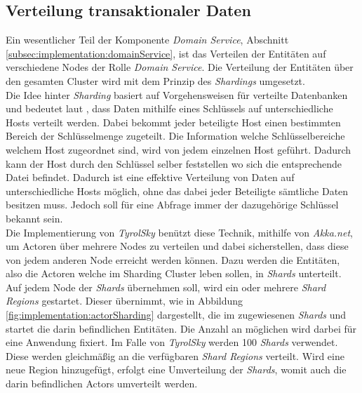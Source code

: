 \subsection{Verteilung transaktionaler Daten}
\label{subsec:implementation:akkaSharding}
Ein wesentlicher Teil der Komponente \textit{Domain Service}, Abschnitt \ref{subsec:implementation:domainService}, ist das Verteilen der Entitäten auf verschiedene Nodes der Rolle \textit{Domain Service}. Die Verteilung der Entitäten über den gesamten Cluster wird mit dem Prinzip des \textit{Shardings} umgesetzt. \\
Die Idee hinter \textit{Sharding} basiert auf Vorgehensweisen für verteilte Datenbanken und bedeutet laut \cite{shardingCattell}, dass Daten mithilfe eines Schlüssels auf unterschiedliche Hosts verteilt werden. Dabei bekommt jeder beteiligte Host einen bestimmten Bereich der Schlüsselmenge zugeteilt.
Die Information welche Schlüsselbereiche welchem Host zugeordnet sind, wird von jedem einzelnen Host geführt. Dadurch kann der Host durch den Schlüssel selber feststellen wo sich die entsprechende Datei befindet.
Dadurch ist eine effektive Verteilung von Daten auf unterschiedliche Hosts möglich, ohne das dabei jeder Beteiligte sämtliche Daten besitzen muss. Jedoch soll für eine Abfrage immer der dazugehörige Schlüssel bekannt sein. \\
Die Implementierung von \textit{TyrolSky} benützt diese Technik, mithilfe von \textit{Akka.net}, um Actoren über mehrere Nodes zu verteilen und dabei sicherstellen, dass diese von jedem anderen Node erreicht werden können. Dazu werden die Entitäten, also die Actoren welche im Sharding Cluster leben sollen, in \textit{Shards} unterteilt. Auf jedem Node der \textit{Shards} übernehmen soll, wird ein oder mehrere \textit{Shard Regions} gestartet. Dieser übernimmt, wie in Abbildung \ref{fig:implementation:actorSharding} dargestellt, die im zugewiesenen \textit{Shards} und startet die darin befindlichen Entitäten. Die Anzahl an möglichen  wird darbei für eine Anwendung fixiert. Im Falle von \textit{TyrolSky} werden {100} \textit{Shards} verwendet. Diese werden gleichmäßig an die verfügbaren \textit{Shard Regions} verteilt. Wird eine neue Region hinzugefügt, erfolgt eine Umverteilung der \textit{Shards}, womit auch die darin befindlichen Actors umverteilt werden. 

